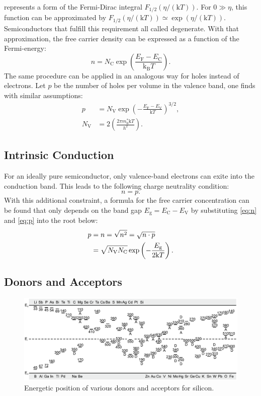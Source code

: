  represents a form of the Fermi-Dirac integral
$F_{1 /2}(\eta  / (\mathrm{k}T))$.
For $0 \gg \eta$,
this function can be approximated by $F_{1 /2}(\eta  / (\mathrm{k}T))
	\simeq \exp(\eta /(\mathrm{k}T))$.
Semiconductors that fulfill this requirement all called degenerate.
With that approximation, the free carrier density can be expressed as
a function of the Fermi-energy:
\begin{equation}
	n	= { N_{\mathrm{C}} }\exp\left( \frac{E_{\mathrm{F}}
		-E_{\mathrm{C}}}{\mathrm{k_B}T} \right).
	\label{eq:n}
\end{equation}
The same procedure can be applied in an analogous way for holes instead of
electrons.
Let $p$ be the number of holes per volume in the valence band,
one finds with similar assumptions:
\begin{align}
	p            & = N_\mathrm{V} \exp
	\left( - \frac{E_{\mathrm{F}}-E_{\mathrm{V}}}{\mathrm{k}T} \right)^{3 / 2}
	\label{eq:p},                                        \\
	N_\mathrm{V} & = 2 \left( \frac{2 \pi m^*_\mathrm{h}
		\mathrm{k}T}{h^2} \right).
\end{align}

\subsection{Intrinsic Conduction}
For an ideally pure semiconductor, only valence-band electrons
can exite into the conduction band.
This leads to the following charge neutrality condition:
\begin{equation}
	n = p.
\end{equation}
With this additional constraint, a formula for the free
carrier concentration can be found that only depends on the
band gap $E_\mathrm{g} = E_\mathrm{C} - E_\mathrm{V}$ by
substituting \cref{eq:n} and \cref{eq:p}
into the root below:
\begin{align}
	p & = n = \sqrt{n^2} = \sqrt{n \cdot p} \notag \\
	  & =\sqrt{ N_{\mathrm{V}}N_{\mathrm{C}} }
	\exp\left( -\frac{E_{\mathrm{g}}}{2\mathrm{k}T} \right).
\end{align}

\subsection{Donors and Acceptors}
\begin{figure}
	\centering
	\includegraphics[width=0.6\linewidth]{../assets/energy_level.png}
	\caption{Energetic position of various donors and acceptors
		for silicon. }
	\label{fig:energy_level}
\end{figure}


